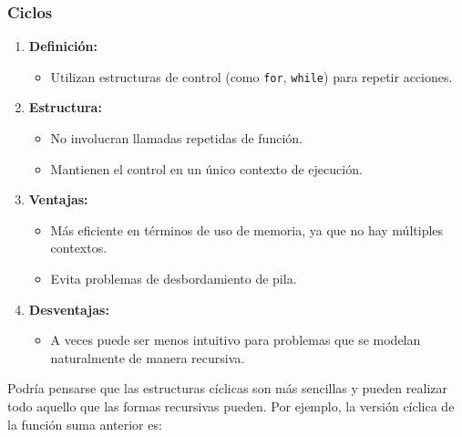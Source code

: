 \subsubsection{Ciclos}

\begin{enumerate}
\item
  \textbf{Definición:}

  \begin{itemize}
  \item
    Utilizan estructuras de control (como \texttt{for}, \texttt{while})
    para repetir acciones.
  \end{itemize}
\item
  \textbf{Estructura:}

  \begin{itemize}
  \item
    No involucran llamadas repetidas de función.
  \item
    Mantienen el control en un único contexto de ejecución.
  \end{itemize}
\item
  \textbf{Ventajas:}

  \begin{itemize}
  \item
    Más eficiente en términos de uso de memoria, ya que no hay múltiples
    contextos.
  \item
    Evita problemas de desbordamiento de pila.
  \end{itemize}
\item
  \textbf{Desventajas:}

  \begin{itemize}
  \item
    A veces puede ser menos intuitivo para problemas que se modelan
    naturalmente de manera recursiva.
  \end{itemize}
\end{enumerate}

Podría pensarse que las estructuras cíclicas son más sencillas y pueden
realizar todo aquello que las formas recursivas pueden. Por ejemplo, la
versión cíclica de la función suma anterior es:\\

